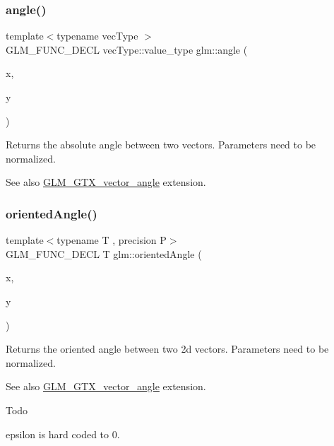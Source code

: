 \subsubsection{\texorpdfstring{angle()}{angle()}}
{\footnotesize\ttfamily template$<$typename vec\+Type $>$ \\
G\+L\+M\+\_\+\+F\+U\+N\+C\+\_\+\+D\+E\+CL vec\+Type\+::value\+\_\+type glm\+::angle (\begin{DoxyParamCaption}\item[{vec\+Type const \&}]{x,  }\item[{vec\+Type const \&}]{y }\end{DoxyParamCaption})}

Returns the absolute angle between two vectors. Parameters need to be normalized. \begin{DoxySeeAlso}{See also}
\hyperlink{group__gtx__vector__angle}{G\+L\+M\+\_\+\+G\+T\+X\+\_\+vector\+\_\+angle} extension. 
\end{DoxySeeAlso}
\mbox{\label{group__gtx__vector__angle_ga82a19d474be13c92c7b10caab42a5a72}} 
\subsubsection{\texorpdfstring{oriented\+Angle()}{orientedAngle()}\hspace{0.1cm}{\footnotesize\ttfamily [1/2]}}
{\footnotesize\ttfamily template$<$typename T , precision P$>$ \\
G\+L\+M\+\_\+\+F\+U\+N\+C\+\_\+\+D\+E\+CL T glm\+::oriented\+Angle (\begin{DoxyParamCaption}\item[{\hyperlink{structglm_1_1tvec2}{tvec2}$<$ T, P $>$ const \&}]{x,  }\item[{\hyperlink{structglm_1_1tvec2}{tvec2}$<$ T, P $>$ const \&}]{y }\end{DoxyParamCaption})}

Returns the oriented angle between two 2d vectors. Parameters need to be normalized. \begin{DoxySeeAlso}{See also}
\hyperlink{group__gtx__vector__angle}{G\+L\+M\+\_\+\+G\+T\+X\+\_\+vector\+\_\+angle} extension.
\end{DoxySeeAlso}
\begin{DoxyRefDesc}{Todo}
\item[\hyperlink{todo__todo000001}{Todo}]epsilon is hard coded to 0. \end{DoxyRefDesc}
\mbox{\label{group__gtx__vector__angle_ga7254dba112eff55f55f9544f41cb9ece}} 
